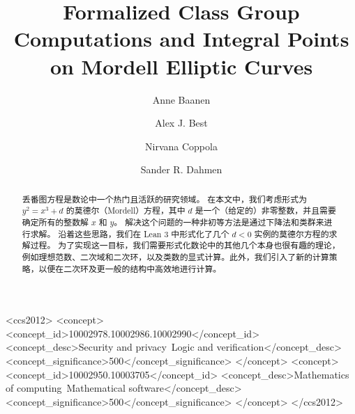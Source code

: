 \documentclass[sigplan,10pt,nonacm,
screen]{acmart} \settopmatter{printfolios=true,printccs=false,printacmref=false}
\begin{document}
\title{Formalized Class Group Computations and Integral Points on Mordell Elliptic Curves}

\author{Anne Baanen}
\author{Alex J. Best}
\author{Nirvana Coppola}
\author{Sander R. Dahmen}


\begin{abstract}
丢番图方程是数论中一个热门且活跃的研究领域。
在本文中，我们考虑形式为 $y^2=x^3+d$ 的莫德尔（Mordell）方程，其中 $d$ 是一个（给定的）非零整数，并且需要确定所有的整数解 $x$ 和 $y$。
解决这个问题的一种非初等方法是通过下降法和类群来进行求解。
沿着这些思路，我们在 Lean 3 中形式化了几个 $d<0$ 实例的莫德尔方程的求解过程。
为了实现这一目标，我们需要形式化数论中的其他几个本身也很有趣的理论，例如理想范数、二次域和二次环，以及类数的显式计算。此外，我们引入了新的计算策略，以便在二次环及更一般的结构中高效地进行计算。
\end{abstract}

\begin{CCSXML}
<ccs2012>
<concept>
<concept_id>10002978.10002986.10002990</concept_id>
<concept_desc>Security and privacy~Logic and verification</concept_desc>
<concept_significance>500</concept_significance>
</concept>
<concept>
<concept_id>10002950.10003705</concept_id>
<concept_desc>Mathematics of computing~Mathematical software</concept_desc>
<concept_significance>500</concept_significance>
</concept>
</ccs2012>
\end{CCSXML}
\end{document}
